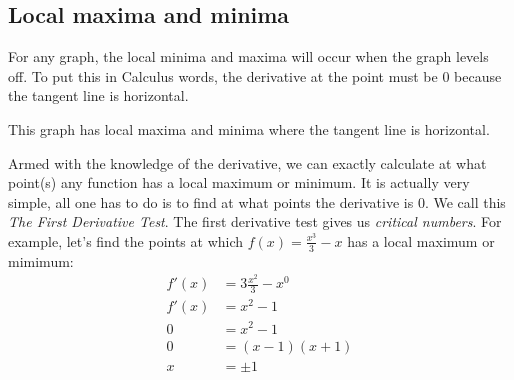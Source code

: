 \documentclass[../main.tex]{subfiles}
\begin{document}
\subsection{Local maxima and minima} For any graph, the local minima and maxima will occur when the graph levels off. To put this in Calculus words, the derivative at the point must be 0 because the tangent line is horizontal.
\begin{center}
	\newline This graph has local maxima and minima where the tangent line is horizontal.
\end{center} 
\newpage Armed with the knowledge of the derivative, we can exactly calculate at what point(s) any function has a local maximum or minimum. It is actually very simple, all one has to do is to find at what points the derivative is 0. We call this \textit{The First Derivative Test}. The first derivative test gives us \textit{critical numbers}. For example, let's find the points at which $f(x)=\displaystyle\frac{x^3}{3}-x$ has a local maximum or mimimum:
\begin{equation}
\begin{split}
f'(x)&=3\frac{x^2}{3}-x^0 \\
f'(x)&=x^2-1 \\
0 &= x^2-1 \\
0 &= (x-1)(x+1) \\
x&=\pm 1
\end{split}
\end{equation}
\end{document}
